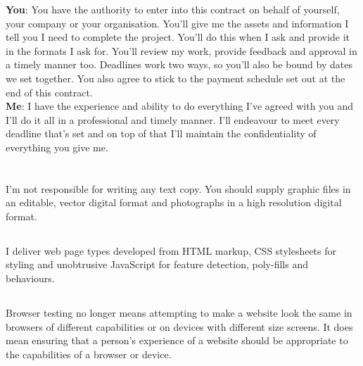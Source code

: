 \documentclass[10px,a4paper]{article}
\begin{document}
\textbf{You}: You have the authority to enter into this contract on behalf of yourself, your company
or your organisation. You'll give me the assets and information I tell you I need to complete the project.
You'll do this when I ask and provide it in the formats I ask for. You'll review my work, provide feedback
and approval in a timely manner too. Deadlines work two ways, so you'll also be bound by dates we set
together. You also agree to stick to the payment schedule set out at the end of this contract.\\

\textbf{Me}: I have the experience and ability to do everything I've agreed with you and I'll do it all
in a professional and timely manner. I'll endeavour to meet every deadline that's set and on top of that
I'll maintain the confidentiality of everything you give me.

\section*{}

\subsection*{}

I'm not responsible for writing any text copy. You should supply graphic files in an editable, vector digital format and
photographs in a high resolution digital format.

\subsection*{}

I deliver web page types developed from HTML markup, CSS stylesheets for styling
and unobtrusive JavaScript for feature detection, poly-fills and behaviours.

\subsection*{}

Browser testing no longer means attempting to make a website look the same in browsers
of different capabilities or on devices with different size screens. It does mean ensuring
that a person's experience of a website should be appropriate to the capabilities of
a browser or device.
\end{document}
